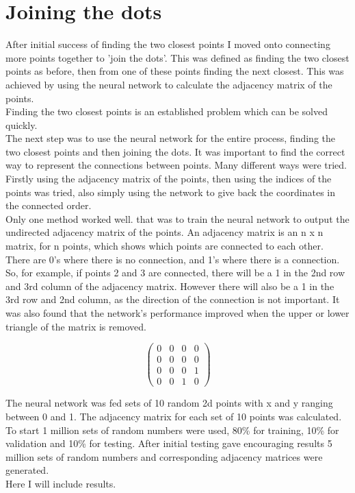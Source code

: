 \section{Joining the dots} %
After initial success of finding the two closest points I moved onto connecting more points together to 'join the dots'. This was defined as finding the two closest points as before, then from one of these points finding the next closest. This was achieved by using the neural network to calculate the adjacency matrix of the points.\\
Finding the two closest points is an established problem which can be solved quickly.\\
The next step was to use the neural network for the entire process, finding the two closest points and then joining the dots. It was important to find the correct way to represent the connections between points. Many different ways were tried. Firstly using the adjacency matrix of the points, then using the indices of the points was tried, also simply using the network to give back the coordinates in the connected order.\\
Only one method worked well. that was to train the neural network to output the undirected adjacency matrix of the points. An adjacency matrix is an n x n matrix, for n points, which shows which points are connected to each other. There are 0's where there is no connection, and 1's where there is a connection. So, for example, if points 2 and 3 are connected, there will be a 1 in the 2nd row and 3rd column of the adjacency matrix. However there will also be a 1 in the 3rd row and 2nd column, as the direction of the connection is not important. It was also found that the network's performance improved when the upper or lower triangle of the matrix is removed.

\[
\begin{pmatrix}
0 & 0 & 0 & 0 \\
0 & 0 & 0 & 0 \\
0 & 0 & 0 & 1 \\
0 & 0 & 1 & 0
\end{pmatrix}
\]

The neural network was fed sets of 10 random 2d points with x and y ranging between 0 and 1. The adjacency matrix for each set of 10 points was calculated. To start 1 million sets of random numbers were used, 80\% for training, 10\% for validation and 10\% for testing. After initial testing gave encouraging results 5 million sets of random numbers and corresponding adjacency matrices were generated.\\
Here I will include results.

